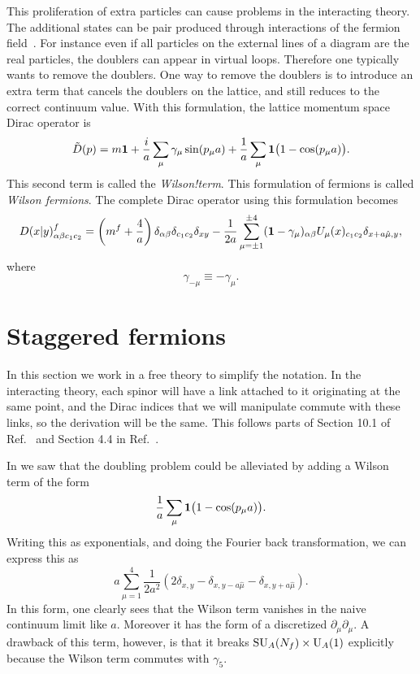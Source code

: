 This proliferation of extra particles can cause problems in the
interacting theory. The additional states can be pair produced
through interactions of the fermion field~\cite{montvay_quantum_1994}.
For instance even if all particles on the external lines of a diagram
are the real particles, the doublers can appear in virtual loops.
Therefore one typically wants to remove the doublers.
One way to remove the doublers is to introduce an extra term that
cancels the doublers on the lattice, and still reduces to the
correct continuum value. With this formulation, the lattice
momentum space Dirac operator is
\begin{equation}
  \tilde{D}(p)=m{\mathbf 1}+\frac{i}{a}\sum_\mu\gamma_\mu\sin(p_\mu a)
                   +\frac{1}{a}\sum_\mu{\mathbf 1}\big(1-\cos(p_\mu a)\big).
\end{equation} 
This second term is called the {\it Wilson!term}. This formulation
of fermions is called {\it Wilson fermions}. The complete Dirac
operator using this formulation becomes 
\begin{equation}
  D(x|y)^f_{\alpha\beta c_1c_2}
  =\left(m^f+\frac{4}{a}\right)\delta_{\alpha\beta}
                               \delta_{c_1c_2}
                               \delta_{xy}
   -\frac{1}{2a}\sum_{\mu=\pm 1}^{\pm 4}({\mathbf 1}-\gamma_\mu)_{\alpha\beta}
      U_\mu(x)_{c_1 c_2}\delta_{x+a\hat{\mu},y},
\end{equation}
where
\begin{equation}
  \gamma_{-\mu}\equiv-\gamma_{\mu}.
\end{equation}

\section{Staggered fermions}

In this section we work in a free theory to simplify the notation.
In the interacting theory, each spinor will have a link attached to it
originating at the same point, and the Dirac indices that we will
manipulate commute with these links, so the derivation will be the same.
This follows parts of Section 10.1 of Ref.~\cite{gattringer_quantum_2010} 
and Section 4.4 in Ref.~\cite{rothe_lattice_2005}.

In  we saw that the doubling problem could
be alleviated by adding a Wilson term of the form
\begin{equation}
  \frac{1}{a}\sum_\mu{\mathbf 1}\big(1-\cos(p_\mu a)\big).
\end{equation}
Writing this as exponentials, and doing the Fourier back transformation,
we can express this as
\begin{equation}
  a\sum_{\mu=1}^4\frac{1}{2a^2}
\left(2\delta_{x,y}-\delta_{x,y-a\hat{\mu}}-\delta_{x,y+a\hat{\mu}}\right).
\end{equation}
In this form, one clearly sees that the Wilson term vanishes in the
naive continuum limit like $a$. Moreover it has the form of a
discretized $\partial_\mu\partial_\mu$. A drawback of this term,
however, is that it breaks $\operatorname{SU}_A(N_f)\times\operatorname{U}_A(1)$ explicitly
because the Wilson term commutes with $\gamma_5$.

